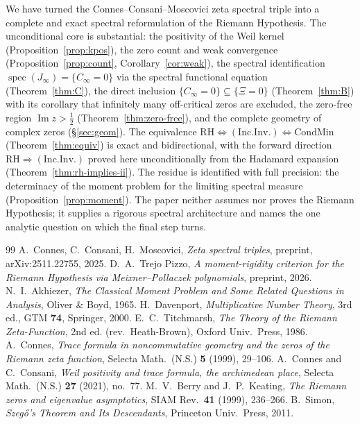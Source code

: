 \documentclass[11pt]{amsart}
\theoremstyle{definition}
\theoremstyle{remark}
\newcommand{\RH}{\mathrm{RH}}
\renewcommand{\Im}{\operatorname{Im}}
\newcommand{\half}{\tfrac12}
\newcommand{\Cinf}{C_\infty}
\newcommand{\Jinf}{J_\infty}
\newcommand{\incInv}{(\mathrm{Inc.Inv.})}
\DeclareMathOperator{\spec}{spec}
\begin{document}
We have turned the Connes--Consani--Moscovici zeta spectral triple into a complete and exact
spectral reformulation of the Riemann Hypothesis. The unconditional core is substantial: the
positivity of the Weil kernel (Proposition~\ref{prop:kpos}), the zero count and weak
convergence (Proposition~\ref{prop:count}, Corollary~\ref{cor:weak}), the spectral
identification $\spec(\Jinf)=\{\Cinf=0\}$ via the spectral functional equation
(Theorem~\ref{thm:C}), the direct inclusion $\{\Cinf=0\}\subseteq\{\Xi=0\}$
(Theorem~\ref{thm:B}) with its corollary that infinitely many off-critical zeros are excluded,
the zero-free region $\Im z>\half$ (Theorem~\ref{thm:zero-free}), and the complete geometry of
complex zeros (\S\ref{sec:geom}). The equivalence $\RH\iff\incInv\iff\mathrm{CondMin}$
(Theorem~\ref{thm:equiv}) is exact and bidirectional, with the forward direction
$\RH\Rightarrow\incInv$ proved here unconditionally from the Hadamard expansion
(Theorem~\ref{thm:rh-implies-ii}). The residue is identified with full precision: the
determinacy of the moment problem for the limiting spectral measure
(Proposition~\ref{prop:moment}). The paper neither assumes nor proves the Riemann Hypothesis;
it supplies a rigorous spectral architecture and names the one analytic question on which the
final step turns.

\begin{thebibliography}{99}
 A.~Connes, C.~Consani, H.~Moscovici, \emph{Zeta spectral triples}, preprint,
arXiv:2511.22755, 2025.
 D.~A.~Trejo Pizzo, \emph{A moment-rigidity criterion for the Riemann
Hypothesis via Meixner--Pollaczek polynomials}, preprint, 2026.
 N.~I.~Akhiezer, \emph{The Classical Moment Problem and Some Related Questions
in Analysis}, Oliver \& Boyd, 1965.
 H.~Davenport, \emph{Multiplicative Number Theory}, 3rd ed., GTM \textbf{74},
Springer, 2000.
 E.~C.~Titchmarsh, \emph{The Theory of the Riemann Zeta-Function}, 2nd ed.
(rev.\ Heath-Brown), Oxford Univ.\ Press, 1986.
 A.~Connes, \emph{Trace formula in noncommutative geometry and the zeros of the Riemann zeta function}, Selecta Math.\ (N.S.) \textbf{5} (1999), 29--106.
 A.~Connes and C.~Consani, \emph{Weil positivity and trace formula, the archimedean place}, Selecta Math.\ (N.S.) \textbf{27} (2021), no.~77.
 M.~V.~Berry and J.~P.~Keating, \emph{The Riemann zeros and eigenvalue asymptotics}, SIAM Rev.\ \textbf{41} (1999), 236--266.
 B.~Simon, \emph{Szeg\H{o}'s Theorem and Its Descendants}, Princeton Univ.\ Press, 2011.
\end{thebibliography}
\end{document}
